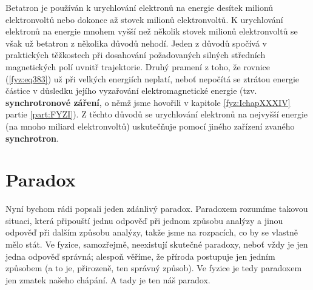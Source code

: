   Betatron je používán k urychlování elektronů na energie desítek milionů elektronvoltů nebo 
  dokonce až stovek milionů elektronvoltů. K urychlování elektronů na energie mnohem vyšší než 
  několik stovek milionů elektronvoltů se však už betatron z několika důvodů nehodí. Jeden z důvodů 
  spočívá v praktických těžkostech při dosahování požadovaných silných středních magnetických polí 
  uvnitř trajektorie. Druhý pramení z toho, že rovnice (\ref{fyz:eq383}) už při velkých energiích 
  neplatí, neboť nepočítá se ztrátou energie částice v důsledku jejího vyzařování elektromagnetické 
  energie (tzv. \textbf{synchrotronové záření}, o němž jsme hovořili v kapitole \ref{fyz:IchapXXXIV} partie 
  \ref{part:FYZI}). Z těchto důvodů se urychlování elektronů na nejvyšší energie (na mnoho miliard 
  elektronvoltů) uskutečňuje pomocí jiného zařízení zvaného \textbf{synchrotron}.
  
\section{Paradox}\label{fyz:IIchapXVIIsecIV}
  Nyní bychom rádi popsali jeden zdánlivý paradox. Paradoxem rozumíme takovou situaci, která 
  připouští jednu odpověď při jednom způsobu analýzy a jinou odpověď při dalším způsobu analýzy, 
  takže jsme na rozpacích, co by se vlastně mělo stát. Ve fyzice, samozřejmě, neexistují skutečné 
  paradoxy, neboť vždy je jen jedna odpověď správná; alespoň věříme, že příroda postupuje jen 
  jedním způsobem (a to je, přirozeně, ten správný způsob). Ve fyzice je tedy paradoxem jen zmatek 
  našeho chápání. A tady je ten náš paradox.
  
